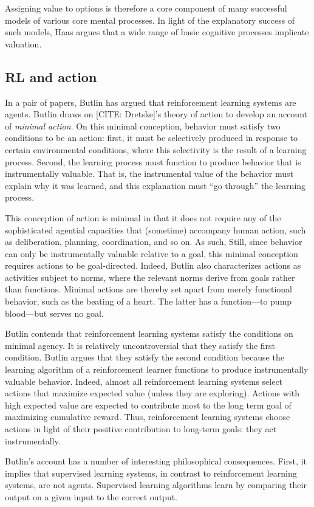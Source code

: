 Assigning value to options is therefore a core component of many successful models of various core mental processes.
In light of the explanatory success of such models, Haas argues that a wide range of basic cognitive processes implicate valuation.

\subsection{RL and action}

In a pair of papers, Butlin has argued that reinforcement learning systems are agents.
Butlin draws on [CITE: Dretske]'s theory of action to develop an account of \emph{minimal action}.
On this minimal conception, behavior must satisfy two conditions to be an action: first, it must be selectively produced in response to certain environmental conditions, where this selectivity is the result of a learning process.
Second, the learning process must function to produce behavior that is instrumentally valuable.
That is, the instrumental value of the behavior must explain why it was learned, and this explanation must ``go through'' the learning process.

This conception of action is minimal in that it does not require any of the sophisticated agential capacities that (sometime) accompany human action, such as deliberation, planning, coordination, and so on.
As such, 
Still, since behavior can only be instrumentally valuable relative to a goal, this minimal conception requires actions to be goal-directed.
Indeed, Butlin also characterizes actions as activities subject to norms, where the relevant norms derive from goals rather than functions. 
Minimal actions are thereby set apart from merely functional behavior, such as the beating of a heart.
The latter has a function---to pump blood---but serves no goal.

Butlin contends that reinforcement learning systems satisfy the conditions on minimal agency.
It is relatively uncontroversial that they satisfy the first condition.
Butlin argues that they satisfy the second condition because the learning algorithm of a reinforcement learner functions to produce instrumentally valuable behavior.
Indeed, almost all reinforcement learning systems select actions that maximize expected value (unless they are exploring).
Actions with high expected value are expected to contribute most to the long term goal of maximizing cumulative reward.
Thus, reinforcement learning systems choose actions in light of their positive contribution to long-term goals: they act instrumentally.

Butlin's account has a number of interesting philosophical consequences.
First, it implies that supervised learning systems, in contrast to reinforcement learning systems, are not agents.
Supervised learning algorithms learn by comparing their output on a given input to the correct output.

